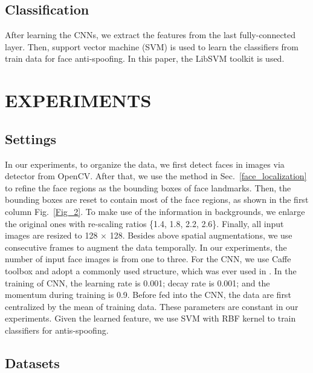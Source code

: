 \documentclass[letterpaper, 10 pt, conference]{ieeeconf}
\begin{document}
\subsection{Classification}

After learning the CNNs, we extract the features from the last fully-connected layer. Then, support vector machine (SVM) is used to learn the classifiers from train data for face anti-spoofing. In this paper, the LibSVM toolkit \cite{Chang01libsvm:a} is used.

\section{EXPERIMENTS}

\subsection{Settings}

In our experiments, to organize the data, we first detect faces in images via detector from OpenCV. After that, we use the method in Sec.~\ref{face_localization} to refine the face regions as the bounding boxes of face landmarks. Then, the bounding boxes are reset to contain most of the face regions, as shown in the first column Fig.~\ref{Fig_2}. To make use of the information in backgrounds, we enlarge the original ones with re-scaling ratios \{1.4, 1.8, 2.2, 2.6\}. Finally, all input images are resized to 128 $\times$ 128. Besides above spatial augmentations, we use consecutive frames to augment the data temporally. In our experiments, the number of input face images is from one to three. For the CNN, we use Caffe toolbox \cite{Jia13caffe} and adopt a commonly used structure, which was ever used in \cite{DBLP:conf/nips/KrizhevskySH12}. In the training of CNN, the learning rate is 0.001; decay rate is 0.001; and the momentum during training is 0.9. Before fed into the CNN, the data are first centralized by the mean of training data. These parameters are constant in our experiments. Given the learned feature, we use SVM with RBF kernel to train classifiers for antis-spoofing.

\subsection{Datasets}
\end{document}
